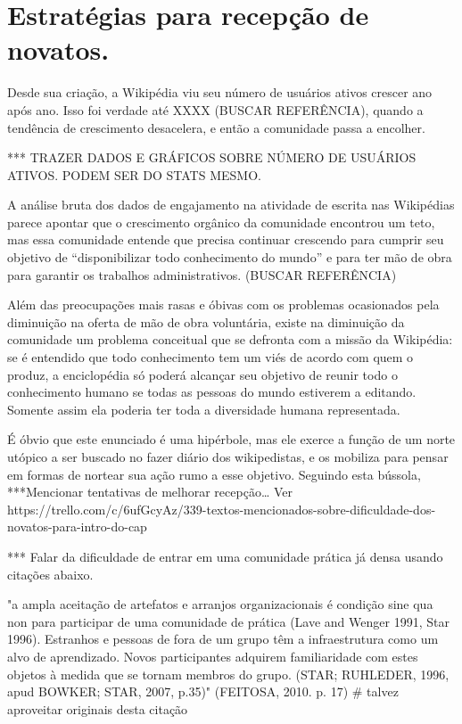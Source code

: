 \section{Estratégias para recepção de novatos.}

Desde sua criação, a Wikipédia viu seu número de usuários ativos crescer ano após ano. Isso foi verdade até XXXX (BUSCAR REFERÊNCIA), quando a tendência de crescimento desacelera, e então a comunidade passa a encolher. 

*** TRAZER DADOS E GRÁFICOS SOBRE NÚMERO DE USUÁRIOS ATIVOS. PODEM SER DO STATS MESMO.

A análise bruta dos dados de engajamento na atividade de escrita nas Wikipédias parece apontar que o crescimento orgânico da comunidade encontrou um teto, mas essa comunidade entende que precisa continuar crescendo para cumprir seu objetivo de ``disponibilizar todo conhecimento do mundo'' e para ter mão de obra para garantir os trabalhos administrativos. (BUSCAR REFERÊNCIA)

Além das preocupações mais rasas e óbivas com os problemas ocasionados pela diminuição na oferta de mão de obra voluntária, existe na diminuição da comunidade um problema conceitual que se defronta com a missão da Wikipédia: se é entendido que todo conhecimento tem um viés de acordo com quem o produz, a enciclopédia só poderá alcançar seu objetivo de reunir todo o conhecimento humano se todas as pessoas do mundo estiverem a editando. Somente assim ela poderia ter toda a diversidade humana representada.

É óbvio que este enunciado é uma hipérbole, mas ele exerce a função de um norte utópico a ser buscado no fazer diário dos wikipedistas, e os mobiliza para pensar em formas de nortear sua ação rumo a esse objetivo. Seguindo esta bússola, ***Mencionar tentativas de melhorar recepção… Ver https://trello.com/c/6ufGcyAz/339-textos-mencionados-sobre-dificuldade-dos-novatos-para-intro-do-cap%

*** Falar da dificuldade de entrar em uma comunidade prática já densa usando citações abaixo.

"a ampla aceitação de artefatos e arranjos organizacionais é condição sine qua non para participar de uma comunidade de prática (Lave and Wenger 1991, Star 1996). Estranhos e pessoas de fora de um grupo têm a infraestrutura como um alvo de aprendizado. Novos participantes adquirem familiaridade com estes objetos à medida que se tornam membros do grupo. (STAR; RUHLEDER, 1996, apud BOWKER; STAR, 2007, p.35)" (FEITOSA, 2010. p. 17) # talvez aproveitar originais desta citação

